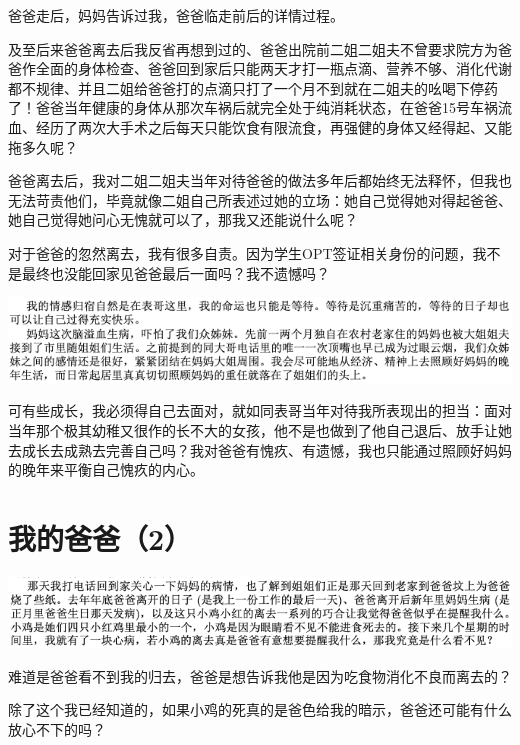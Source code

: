 \documentclass[9pt, b5paper]{article}
\begin{document}
爸爸走后，妈妈告诉过我，爸爸临走前后的详情过程。

及至后来爸爸离去后我反省再想到过的、爸爸出院前二姐二姐夫不曾要求院方为爸爸作全面的身体检查、爸爸回到家后只能两天才打一瓶点滴、营养不够、消化代谢都不规律、并且二姐给爸爸打的点滴只打了一个月不到就在二姐夫的吆喝下停药了！爸爸当年健康的身体从那次车祸后就完全处于纯消耗状态，在爸爸15号车祸流血、经历了两次大手术之后每天只能饮食有限流食，再强健的身体又经得起、又能拖多久呢？

爸爸离去后，我对二姐二姐夫当年对待爸爸的做法多年后都始终无法释怀，但我也无法苛责他们，毕竟就像二姐自己所表述过她的立场：她自己觉得她对得起爸爸、她自己觉得她问心无愧就可以了，那我又还能说什么呢？

对于爸爸的忽然离去，我有很多自责。因为学生OPT签证相关身份的问题，我不是最终也没能回家见爸爸最后一面吗？我不遗憾吗？

\begin{center}
\includegraphics[width=.9\linewidth]{./pic/backups_plans_20210417_120117.png}
\end{center}

可有些成长，我必须得自己去面对，就如同表哥当年对待我所表现出的担当：面对当年那个极其幼稚又很作的长不大的女孩，他不是也做到了他自己退后、放手让她去成长去成熟去完善自己吗？我对爸爸有愧疚、有遗憾，我也只能通过照顾好妈妈的晚年来平衡自己愧疚的内心。

\section{我的爸爸（2）}
\label{sec:org90e775b}

\begin{center}
\includegraphics[width=.9\linewidth]{./pic/backups_plans_20210415_093929.png}
\end{center}

难道是爸爸看不到我的归去，爸爸是想告诉我他是因为吃食物消化不良而离去的？

除了这个我已经知道的，如果小鸡的死真的是爸色给我的暗示，爸爸还可能有什么放心不下的吗？
\end{document}
